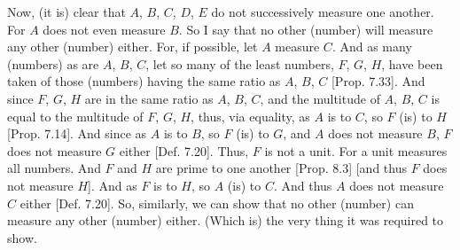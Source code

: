 \begin{Parallel}{}{}
{ Now, (it is) clear that $A$, $B$, $C$, $D$, $E$ do not successively measure
 one another. For $A$ does not even measure $B$. So I say that  
 no other (number) will measure any other (number) either. For, if possible, let $A$ measure
 $C$. And as many (numbers) as  are $A$, $B$, $C$, let  so many of the least numbers,
 $F$, $G$, $H$, have been taken of those (numbers) having the same ratio as $A$, $B$, $C$ [Prop. 7.33]. And since $F$, $G$, $H$ are in the same ratio as $A$, $B$, $C$, and the multitude of
 $A$, $B$, $C$ is equal to the multitude of $F$, $G$, $H$, thus, via
 equality, as $A$ is to $C$, so $F$ (is) to $H$ [Prop. 7.14]. And since as $A$ is to $B$, so $F$ (is) to $G$, and $A$ does not measure $B$, $F$ does not measure $G$ either
 [Def. 7.20]. Thus, $F$ is not a unit. For a unit measures all numbers. And $F$ and $H$ are prime to one another [Prop. 8.3] [and thus $F$ does not measure $H$].
 And as $F$ is to $H$, so $A$ (is) to $C$. And thus $A$ does not measure
 $C$ either [Def. 7.20]. So, similarly, we can show
 that no other (number) can measure any other (number) either.
 (Which is) the very thing it was required to show.}
\end{Parallel}

\begin{Parallel}{}{} 

\end{Parallel}

